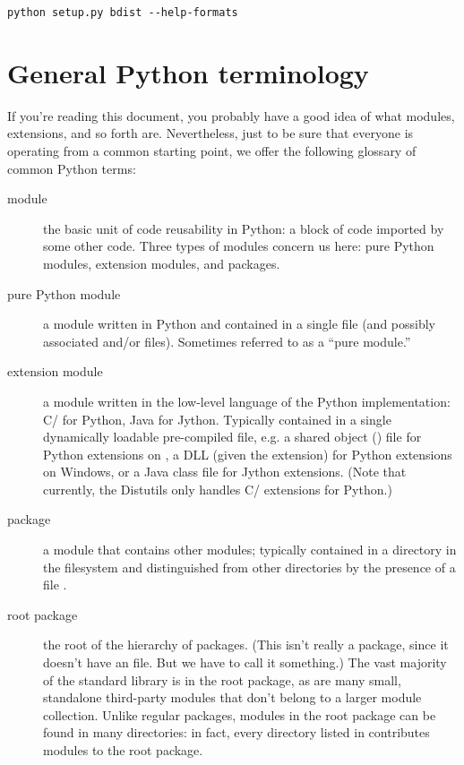 \documentclass{manual}
\begin{document}
\begin{verbatim}
python setup.py bdist --help-formats
\end{verbatim}


\section{General Python terminology}
\label{python-terms}

If you're reading this document, you probably have a good idea of what
modules, extensions, and so forth are.  Nevertheless, just to be sure
that everyone is operating from a common starting point, we offer the
following glossary of common Python terms:
\begin{description}
\item[module] the basic unit of code reusability in Python: a block of
  code imported by some other code.  Three types of modules concern us
  here: pure Python modules, extension modules, and packages.

\item[pure Python module] a module written in Python and contained in a
  single  file (and possibly associated  and/or
   files).  Sometimes referred to as a ``pure module.''

\item[extension module] a module written in the low-level language of
  the Python implementation: C/\Cpp{} for Python, Java for Jython.
  Typically contained in a single dynamically loadable pre-compiled
  file, e.g. a shared object () file for Python extensions on
  \UNIX, a DLL (given the  extension) for Python extensions
  on Windows, or a Java class file for Jython extensions.  (Note that
  currently, the Distutils only handles C/\Cpp{} extensions for Python.)

\item[package] a module that contains other modules; typically contained
  in a directory in the filesystem and distinguished from other
  directories by the presence of a file .

\item[root package] the root of the hierarchy of packages.  (This isn't
  really a package, since it doesn't have an 
  file.  But we have to call it something.)  The vast majority of the
  standard library is in the root package, as are many small, standalone
  third-party modules that don't belong to a larger module collection.
  Unlike regular packages, modules in the root package can be found in
  many directories: in fact, every directory listed in 
  contributes modules to the root package.
\end{description}
\end{document}
